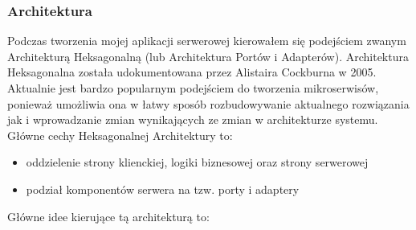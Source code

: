 \subsubsection{Architektura}
Podczas tworzenia mojej aplikacji serwerowej kierowałem się podejściem zwanym Architekturą Heksagonalną (lub Architektura Portów i Adapterów).
Architektura Heksagonalna została udokumentowana przez Alistaira Cockburna w 2005. Aktualnie jest bardzo popularnym podejściem do tworzenia mikroserwisów, ponieważ umożliwia ona w łatwy sposób rozbudowywanie aktualnego rozwiązania jak i wprowadzanie zmian wynikających ze zmian w architekturze systemu.
Główne cechy Heksagonalnej Architektury to:
\begin{itemize}
  \item oddzielenie strony klienckiej, logiki biznesowej oraz strony serwerowej
  \item podział komponentów serwera na tzw. porty i adaptery
\end{itemize}
Główne idee kierujące tą architekturą to:
